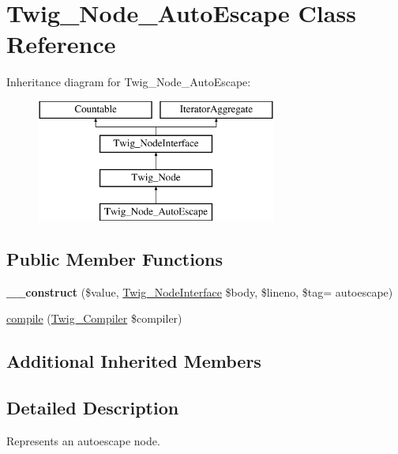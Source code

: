 \hypertarget{class_twig___node___auto_escape}{}\section{Twig\+\_\+\+Node\+\_\+\+Auto\+Escape Class Reference}
\label{class_twig___node___auto_escape}
Inheritance diagram for Twig\+\_\+\+Node\+\_\+\+Auto\+Escape\+:\begin{figure}[H]
\begin{center}
\leavevmode
\includegraphics[height=4.000000cm]{class_twig___node___auto_escape}
\end{center}
\end{figure}
\subsection*{Public Member Functions}
\begin{DoxyCompactItemize}
\item 
\hypertarget{class_twig___node___auto_escape_a936cacf2b37c2b84fa04b39621f499ec}{}{\bfseries \+\_\+\+\_\+construct} (\$value, \hyperlink{interface_twig___node_interface}{Twig\+\_\+\+Node\+Interface} \$body, \$lineno, \$tag= \textquotesingle{}autoescape\textquotesingle{})\label{class_twig___node___auto_escape_a936cacf2b37c2b84fa04b39621f499ec}

\item 
\hyperlink{class_twig___node___auto_escape_a4e0faa87c3fae583620b84d3607085da}{compile} (\hyperlink{class_twig___compiler}{Twig\+\_\+\+Compiler} \$compiler)
\end{DoxyCompactItemize}
\subsection*{Additional Inherited Members}


\subsection{Detailed Description}
Represents an autoescape node.

